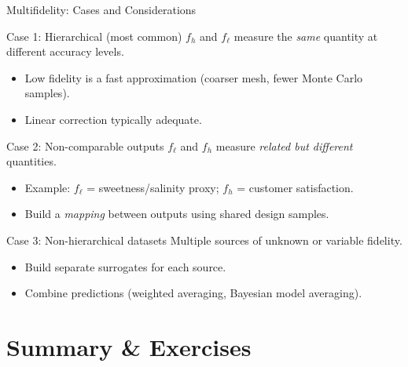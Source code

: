 \documentclass[aspectratio=169,10pt]{beamer}
\begin{document}
\begin{frame}{Multifidelity: Cases and Considerations}
  \begin{block}{Case 1: Hierarchical (most common)}
    $f_h$ and $f_\ell$ measure the \emph{same} quantity at different accuracy levels.
    \begin{itemize}
      \item Low fidelity is a fast approximation (coarser mesh, fewer Monte Carlo samples).
      \item Linear correction typically adequate.
    \end{itemize}
  \end{block}

  \begin{block}{Case 2: Non-comparable outputs}
    $f_\ell$ and $f_h$ measure \emph{related but different} quantities.
    \begin{itemize}
      \item Example: $f_\ell$ = sweetness/salinity proxy; $f_h$ = customer satisfaction.
      \item Build a \emph{mapping} between outputs using shared design samples.
    \end{itemize}
  \end{block}

  \begin{block}{Case 3: Non-hierarchical datasets}
    Multiple sources of unknown or variable fidelity.
    \begin{itemize}
      \item Build separate surrogates for each source.
      \item Combine predictions (weighted averaging, Bayesian model averaging).
    \end{itemize}
  \end{block}
\end{frame}

\section{Summary \& Exercises}
\end{document}
